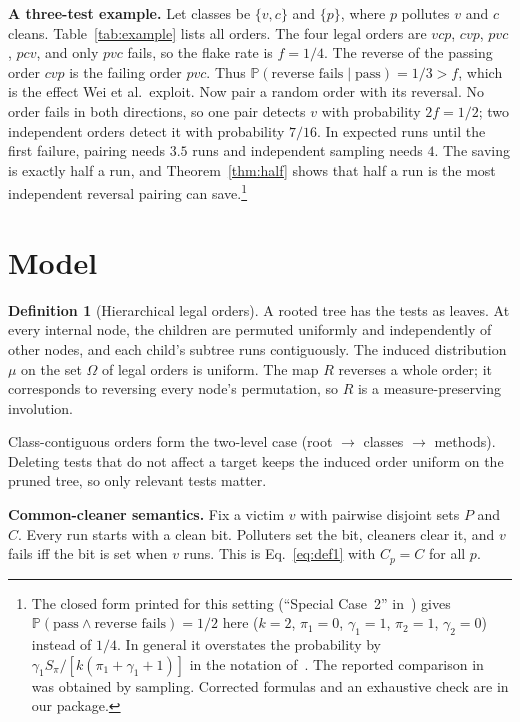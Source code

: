 \documentclass[conference,letterpaper]{IEEEtran}
\theoremstyle{definition}
\newtheorem{definition}{Definition}
\newcommand{\Prb}{\mathbb{P}}
\begin{document}
\textbf{A three-test example.} Let classes be $\{v,c\}$ and $\{p\}$, where $p$ pollutes $v$ and $c$ cleans. Table~\ref{tab:example} lists all orders. The four legal orders are $vcp$, $cvp$, $pvc$, $pcv$, and only $pvc$ fails, so the flake rate is $f=1/4$. The reverse of the passing order $cvp$ is the failing order $pvc$. Thus $\Prb(\text{reverse fails}\mid\text{pass})=1/3>f$, which is the effect Wei et al.\ exploit. Now pair a random order with its reversal. No order fails in both directions, so one pair detects $v$ with probability $2f=1/2$; two independent orders detect it with probability $7/16$. In expected runs until the first failure, pairing needs $3.5$ runs and independent sampling needs $4$. The saving is exactly half a run, and Theorem~\ref{thm:half} shows that half a run is the most independent reversal pairing can save.\footnote{The closed form printed for this setting (``Special Case~2'' in~\cite[Sec.~4.4]{wei2021tacas}) gives $\Prb(\text{pass}\wedge\text{reverse fails})=1/2$ here ($k=2$, $\pi_1=0$, $\gamma_1=1$, $\pi_2=1$, $\gamma_2=0$) instead of $1/4$. In general it overstates the probability by $\gamma_1 S_\pi/[k(\pi_1+\gamma_1+1)]$ in the notation of~\cite{wei2021tacas}. The reported comparison in~\cite{wei2021tacas} was obtained by sampling. Corrected formulas and an exhaustive check are in our package.}

\section{Model}\label{sec:model}
\begin{definition}[Hierarchical legal orders]
A rooted tree has the tests as leaves. At every internal node, the children are permuted uniformly and independently of other nodes, and each child's subtree runs contiguously. The induced distribution $\mu$ on the set $\Omega$ of legal orders is uniform. The map $R$ reverses a whole order; it corresponds to reversing every node's permutation, so $R$ is a measure-preserving involution.
\end{definition}
Class-contiguous orders form the two-level case (root $\to$ classes $\to$ methods). Deleting tests that do not affect a target keeps the induced order uniform on the pruned tree, so only relevant tests matter.

\textbf{Common-cleaner semantics.} Fix a victim $v$ with pairwise disjoint sets $P$ and $C$. Every run starts with a clean bit. Polluters set the bit, cleaners clear it, and $v$ fails iff the bit is set when $v$ runs. This is Eq.~\eqref{eq:def1} with $C_p=C$ for all $p$.
\end{document}
